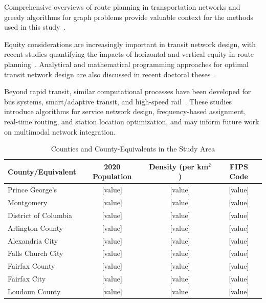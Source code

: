 \documentclass[manuscript]{acmart}
\begin{document}
Comprehensive overviews of route planning in transportation networks and greedy algorithms for graph problems provide valuable context for the methods used in this study~\cite{bib:bast2016route,davis2007greedy}.

Equity considerations are increasingly important in transit network design, with recent studies quantifying the impacts of horizontal and vertical equity in route planning~\cite{bib:camporeale2017equity}. Analytical and mathematical programming approaches for optimal transit network design are also discussed in recent doctoral theses~\cite{fan2004optimal,mahmoudi2024optimal}.

Beyond rapid transit, similar computational processes have been developed for bus systems, smart/adaptive transit, and high-speed rail~\cite{nayan2016bus,owais2022frequency,perivier2021realtime,roy2023hsr}. These studies introduce algorithms for service network design, frequency-based assignment, real-time routing, and station location optimization, and may inform future work on multimodal network integration.



\begin{table}[h]
\caption{Counties and County-Equivalents in the Study Area}
\label{tab:counties}
\begin{tabular}{lccc}
\toprule
County/Equivalent & 2020 Population & Density (per km$^2$) & FIPS Code \\
\midrule
Prince George's & [value] & [value] & [value] \\
Montgomery & [value] & [value] & [value] \\
District of Columbia & [value] & [value] & [value] \\
Arlington County & [value] & [value] & [value] \\
Alexandria City & [value] & [value] & [value] \\
Falls Church City & [value] & [value] & [value] \\
Fairfax County & [value] & [value] & [value] \\
Fairfax City & [value] & [value] & [value] \\
Loudoun County & [value] & [value] & [value] \\
\bottomrule
\end{tabular}
\end{table}

\end{document}
